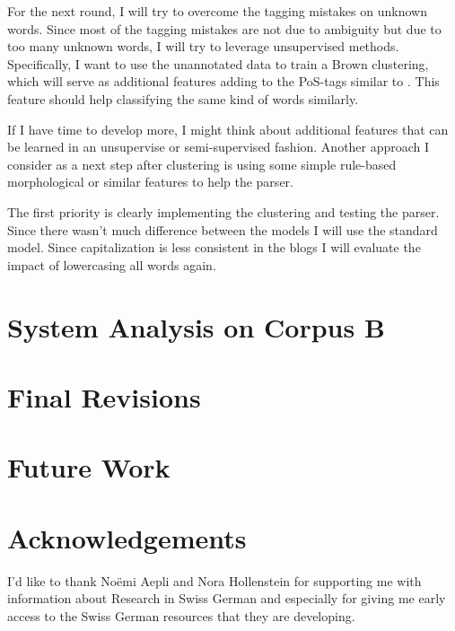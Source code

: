 \documentclass[11pt,letterpaper, covington]{article}
\begin{document}
For the next round, I will try to overcome the tagging mistakes on unknown words. Since most of the tagging mistakes are not due to ambiguity but due to too many unknown words, I will try to leverage unsupervised methods. Specifically, I want to use the unannotated data to train a Brown clustering, which will serve as additional features adding to the PoS-tags similar to \citet{KCC08}. This feature should help classifying the same kind of words similarly. 

If I have time to develop more, I might think about additional features that can be learned in an unsupervise or semi-supervised fashion. Another approach I consider as a next step after clustering is using some simple rule-based morphological or similar features to help the parser. 

The first priority is clearly implementing the clustering and testing the parser. Since there wasn't much difference between the models I will use the standard model. Since capitalization is less consistent in the blogs I will evaluate the impact of lowercasing all words again. 

\section{System Analysis on Corpus B}







\section{Final Revisions}

\section{Future Work}


\section{Acknowledgements}
I'd like to thank Noëmi Aepli and Nora Hollenstein for supporting me with information about Research in Swiss German and especially for giving me early access to the Swiss German resources that they are developing. 



\label{lastpage}
\end{document}
